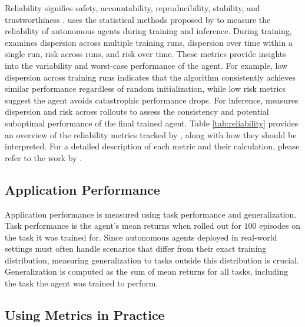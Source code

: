 Reliability signifies safety, accountability, reproducibility, stability, and trustworthiness \citep{chan2019measuring, roszel2021know}.
\method uses the statistical methods proposed by \citet{chan2019measuring} to measure the reliability of autonomous agents during training and inference.
During training, \method examines dispersion across multiple training runs, dispersion over time within a single run, risk across runs, and risk over time.
These metrics provide insights into the variability and worst-case performance of the agent. For example, low dispersion across training runs indicates that the algorithm consistently achieves similar performance regardless of random initialization, while low risk metrics suggest the agent avoids catastrophic performance drops.
For inference, \method measures dispersion and risk across rollouts to assess the consistency and potential suboptimal performance of the final trained agent.
Table \ref{tab:reliability} provides an overview of the reliability metrics tracked by \method, along with how they should be interpreted.
For a detailed description of each metric and their calculation, please refer to the work by \citet{chan2019measuring}.

\subsection{Application Performance}
\label{ssec:application_performance}

Application performance is measured using task performance and generalization.
Task performance is the agent's mean returns when rolled out for $100$ episodes on the task it was trained for.
Since autonomous agents deployed in real-world settings must often handle scenarios that differ from their exact training distribution, measuring generalization to tasks outside this distribution is crucial.
Generalization is computed as the sum of mean returns for all tasks, including the task the agent was trained to perform.

\subsection{Using \method Metrics in Practice}
\label{ssec:metric_selection}

